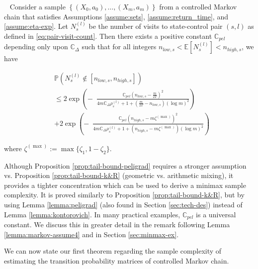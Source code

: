 \documentclass[opre,sglanonrev]{informs4}
\numberwithin{equation}{section}
\newcommand{\pow}[1]{^{(#1)}}
\newcommand{\lp}{\left(}
\newcommand{\rp}{\right)}
\newcommand{\Cbb}{\mathbb{C}}
\newcommand{\Pbb}{\mathbb{P}}
\newcommand{\constant}{\Cbb}
\newcommand{\indexeddata}{\left\{(X_0,a_0),\dots,(X_m,a_m)\right\}}
\newcommand{\prob}{\Pbb}
\newcommand{\expec}{\mathbb{E}}
\begin{document}
{\begin{proposition}~\label{prop:tail-bound-peligrad} Consider a sample $\indexeddata$ from a controlled Markov chain that satisfies Assumptions \ref{assume:sets}, \ref{assume:return_time}, and \ref{assume:eta-exp}. 
Let $N_s\pow{l}$ be the number of visits to state-control pair $(s,l)$ as defined in \cref{eq:pair-visit-count}. 
Then there exists a positive constant $\constant_{pel}$ depending only upon $\constant_\Delta$ such that for all integers $n_{low,s}<\expec[N_s\pow{l}]<n_{high,s}$, we have 
\begin{footnotesize}
\begin{align*}
    &\prob(N_s^{(l)}\notin [n_{low,s},n_{high,s}]) \\
    &\leq 2 \exp\left(- \; \ \frac{\constant_{pel}\lp n_{low,s}-\frac{m}{2T}\rp^2}{4m\constant_\Delta\rho_s\pow{l}+1+\lp \frac{m}{2T}-n_{low,s}\rp\lp\log m\rp^2}  \right)\\
    & + 2\exp\left(- \; \ \frac{\constant_{pel}\lp n_{high,s}-m\zeta\pow\max\rp^2}{4m\constant_\Delta\rho_s\pow{l}+1+\lp n_{high,s}-m\zeta\pow\max\rp\lp\log m\rp^2}  \right)
\end{align*}
\end{footnotesize}
where $\zeta^{(\max)}:=\max\{\zeta_1,1-\zeta_2\}$.
\end{proposition}
{ Although Proposition \ref{prop:tail-bound-peligrad} requires a stronger assumption vs. Proposition \ref{prop:tail-bound-k&R} (geometric vs. arithmetic mixing), it provides a tighter concentration which can be used to derive a minimax sample complexity}. It is proved similarly to Proposition \ref{prop:tail-bound-k&R}, but by using Lemma \ref{lemma:peligrad} (also found in Section \ref{sec:tech-des}) instead of Lemma \ref{lemma:kontorovich}. In many practical examples, $\constant_{pel}$ is a universal constant. We discuss this in greater detail in the remark following Lemma \ref{lemma:markov-assume4} and in Section \ref{sec:minmax-ex}. 


We can now state our first theorem regarding the sample complexity of estimating the transition probability matrices of controlled Markov chain.

}
\end{document}
